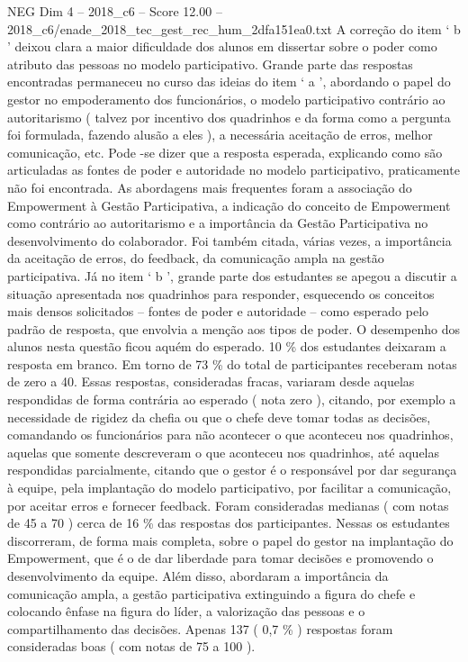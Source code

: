 \begin{textsample}{NEG Dim 4 – 2018\_c6 – Score 12.00 – 2018\_c6/enade\_2018\_tec\_gest\_rec\_hum\_2dfa151ea0.txt}
A correção do item ‘ b ’ deixou clara a maior dificuldade dos alunos em dissertar sobre o poder como atributo das pessoas no modelo participativo.
Grande parte das respostas encontradas permaneceu no curso das ideias do item ‘ a ’, abordando o papel do gestor no empoderamento dos funcionários, o modelo participativo contrário ao autoritarismo ( talvez por incentivo dos quadrinhos e da forma como a pergunta foi formulada, fazendo alusão a eles ), a necessária aceitação de erros, melhor comunicação, etc.
Pode -se dizer que a resposta esperada, explicando como são articuladas as fontes de poder e autoridade no modelo participativo, praticamente não foi encontrada.
As abordagens mais frequentes foram a associação do Empowerment à Gestão Participativa, a indicação do conceito de Empowerment como contrário ao autoritarismo e a importância da Gestão Participativa no desenvolvimento do colaborador.
Foi também citada, várias vezes, a importância da aceitação de erros, do feedback, da comunicação ampla na gestão participativa.
Já no item ‘ b ’, grande parte dos estudantes se apegou a discutir a situação apresentada nos quadrinhos para responder, esquecendo os conceitos mais densos solicitados – fontes de poder e autoridade – como esperado pelo padrão de resposta, que envolvia a menção aos tipos de poder.
O desempenho dos alunos nesta questão ficou aquém do esperado. 10 \% dos estudantes deixaram a resposta em branco.
Em torno de 73 \% do total de participantes receberam notas de zero a 40.
Essas respostas, consideradas fracas, variaram desde aquelas respondidas de forma contrária ao esperado ( nota zero ), citando, por exemplo a necessidade de rigidez da chefia ou que o chefe deve tomar todas as decisões, comandando os funcionários para não acontecer o que aconteceu nos quadrinhos, aquelas que somente descreveram o que aconteceu nos quadrinhos, até aquelas respondidas parcialmente, citando que o gestor é o responsável por dar segurança à equipe, pela implantação do modelo participativo, por facilitar a comunicação, por aceitar erros e fornecer feedback.
Foram consideradas medianas ( com notas de 45 a 70 ) cerca de 16 \% das respostas dos participantes.
Nessas os estudantes discorreram, de forma mais completa, sobre o papel do gestor na implantação do Empowerment, que é o de dar liberdade para tomar decisões e promovendo o desenvolvimento da equipe.
Além disso, abordaram a importância da comunicação ampla, a gestão participativa extinguindo a figura do chefe e colocando ênfase na figura do líder, a valorização das pessoas e o compartilhamento das decisões.
Apenas 137 ( 0,7 \% ) respostas foram consideradas boas ( com notas de 75 a 100 ).

\end{textsample}
